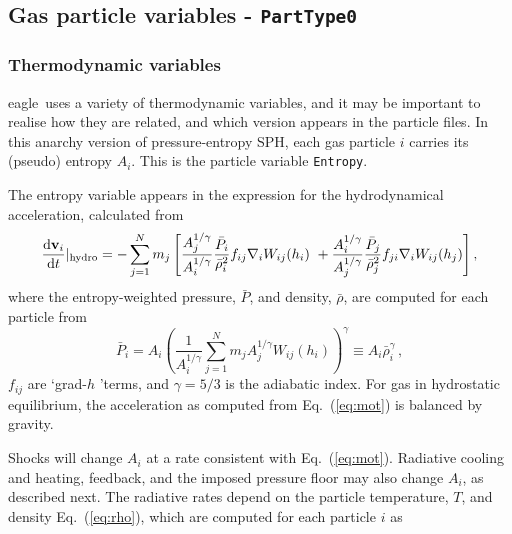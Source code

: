 \documentclass[10pt, a4paper]{article}
\newcommand{\eagle}{{\sc eagle}}
\begin{document}
\subsection{Gas particle variables - \texttt{PartType0}}
\subsubsection{Thermodynamic variables}
\label{sect:thermo}
\eagle\ uses a variety of thermodynamic variables, and it may be important to
realise how they are related, and which version appears in the particle files.
In this {\sc anarchy} version of pressure-entropy SPH, each gas particle $i$
carries its (pseudo) entropy $A_i$. This is the particle variable
\texttt{Entropy}.

The entropy variable appears in the expression for the hydrodynamical
acceleration, calculated from \begin{equation} \frac{{\rm d}\mathbf{v}_i}{{\rm
d}t}|_{\rm hydro}=-\sum_{j=1}^N m_j  \left[
\frac{A_j^{1/\gamma}}{A_i^{1/\gamma}}\frac{\bar{P}_i}{\bar{\rho}_i^2}f_{ij}\nabla_i
W_{ij}(h_i) ~ +
\frac{A_i^{1/\gamma}}{A_j^{1/\gamma}}\frac{\bar{P}_j}{\bar{\rho}_j^2}f_{ji}\nabla_i
W_{ij}(h_j) \right] , \label{eq:mot} \end{equation} where the entropy-weighted
pressure, $\bar{P}$, and density, $\bar{\rho}$, are computed for each particle
from \begin{equation} \bar{P}_i = A_i
\left(\frac{1}{A_i^{1/\gamma}}\sum_{j=1}^N m_j A_j^{1/\gamma}
W_{ij}(h_i)\right)^{\gamma} \equiv A_i \bar{\rho}_i^{\gamma} \,, \label{eq:pS}
\end{equation} $f_{ij}$ are \lq grad-$h$ \rq terms, and $\gamma=5/3$ is the adiabatic index. For
gas in hydrostatic equilibrium, the acceleration as computed from
Eq.~(\ref{eq:mot}) is balanced by gravity. 

Shocks will change $A_i$ at a rate consistent with Eq.~(\ref{eq:mot}).
Radiative cooling and heating, feedback, and the imposed pressure floor may
also change $A_i$, as described next.  The radiative rates depend on the
particle temperature, $T$, and density Eq.~(\ref{eq:rho}), which are computed
for each particle $i$ as
\end{document}
